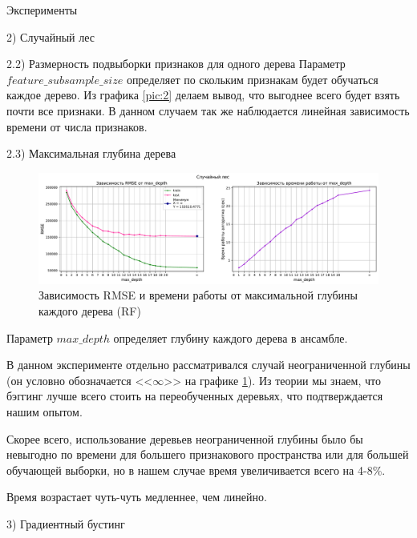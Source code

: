 \documentclass[a4paper,12pt,titlepage,finall]{article}
\begin{document}
\begin{section}{Эксперименты}
\begin{subsection}{2) Случайный лес}
\begin{subsubsection}{2.2) Размерность подвыборки признаков для одного дерева}
Параметр $feature\_subsample\_size$ определяет по скольким признакам будет обучаться каждое дерево. Из графика \ref{pic:2} делаем вывод, что выгоднее всего будет взять почти все признаки. В данном случаем так же наблюдается линейная зависимость времени от числа признаков.


\end{subsubsection}

\begin{subsubsection}{2.3) Максимальная глубина дерева}
\begin{figure}[H]
	\includegraphics[scale=0.9, width=17cm]{S_3.pdf}
	\centering
	\caption{Зависимость RMSE и времени работы от максимальной глубины каждого дерева (RF)}
	\label{pic:3}
\end{figure}
Параметр $max\_depth$ определяет глубину каждого дерева в ансамбле. \par
В данном эксперименте отдельно рассматривался случай неограниченной глубины (он условно обозначается <<$\infty$>> на графике \ref{pic:3}).
Из теории мы знаем, что бэггинг лучше всего стоить на переобученных деревьях, что подтверждается нашим опытом. \par Скорее всего, использование деревьев неограниченной глубины было бы невыгодно по времени для большего признакового пространства или для большей обучающей выборки, но в нашем случае время увеличивается всего на 4-8\%. \par
Время возрастает чуть-чуть медленнее, чем линейно.
\end{subsubsection}

\end{subsection}

\begin{subsection}{3) Градиентный бустинг}


\end{subsection}
\end{section}
\end{document}
